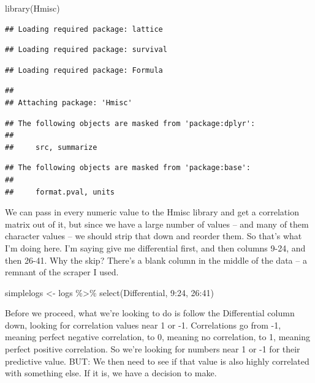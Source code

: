\documentclass[
]{book}
\newenvironment{Shaded}{\begin{snugshade}}{\end{snugshade}}
\newcommand{\DecValTok}[1]{\textcolor[rgb]{0.00,0.00,0.81}{#1}}
\newcommand{\FunctionTok}[1]{\textcolor[rgb]{0.00,0.00,0.00}{#1}}
\newcommand{\NormalTok}[1]{#1}
\newcommand{\OtherTok}[1]{\textcolor[rgb]{0.56,0.35,0.01}{#1}}
\newcommand{\SpecialCharTok}[1]{\textcolor[rgb]{0.00,0.00,0.00}{#1}}
\begin{document}
\begin{Shaded}
\begin{Highlighting}[]
\FunctionTok{library}\NormalTok{(Hmisc)}
\end{Highlighting}
\end{Shaded}

\begin{verbatim}
## Loading required package: lattice
\end{verbatim}

\begin{verbatim}
## Loading required package: survival
\end{verbatim}

\begin{verbatim}
## Loading required package: Formula
\end{verbatim}

\begin{verbatim}
## 
## Attaching package: 'Hmisc'
\end{verbatim}

\begin{verbatim}
## The following objects are masked from 'package:dplyr':
## 
##     src, summarize
\end{verbatim}

\begin{verbatim}
## The following objects are masked from 'package:base':
## 
##     format.pval, units
\end{verbatim}

We can pass in every numeric value to the Hmisc library and get a correlation matrix out of it, but since we have a large number of values -- and many of them character values -- we should strip that down and reorder them. So that's what I'm doing here. I'm saying give me differential first, and then columns 9-24, and then 26-41. Why the skip? There's a blank column in the middle of the data -- a remnant of the scraper I used.

\begin{Shaded}
\begin{Highlighting}[]
\NormalTok{simplelogs }\OtherTok{\textless{}{-}}\NormalTok{ logs }\SpecialCharTok{\%\textgreater{}\%} \FunctionTok{select}\NormalTok{(Differential, }\DecValTok{9}\SpecialCharTok{:}\DecValTok{24}\NormalTok{, }\DecValTok{26}\SpecialCharTok{:}\DecValTok{41}\NormalTok{)}
\end{Highlighting}
\end{Shaded}

Before we proceed, what we're looking to do is follow the Differential column down, looking for correlation values near 1 or -1. Correlations go from -1, meaning perfect negative correlation, to 0, meaning no correlation, to 1, meaning perfect positive correlation. So we're looking for numbers near 1 or -1 for their predictive value. BUT: We then need to see if that value is also highly correlated with something else. If it is, we have a decision to make.
\end{document}

